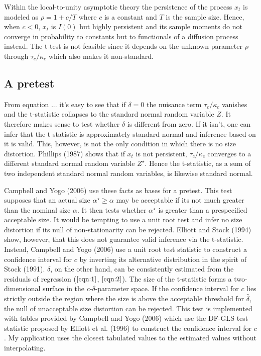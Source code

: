 \documentclass{article}
\begin{document}
Within the local-to-unity asymptotic theory the persistence of the process $x_{t}$ is modeled as $\rho=1+c / T$ where $c$ is a constant and $T$ is the sample size. Hence, when $c<0$, $x_{t}$ is $I(0)$ but highly persistent and its sample moments do not converge in probability to constants but to functionals of a diffusion process instead.  The t-test is not feasible since it depends on the unknown parameter $\rho$ through $\tau_{c} / \kappa_{c}$ which also makes it non-standard. 

\subsection{A pretest}
\label{pretest}
From equation ... it's easy to see that if $\delta = 0$ the nuisance term $\tau_{c} / \kappa_{c}$ vanishes and the t-statistic collapses to the standard normal  random variable $Z$. It therefore makes sense to test whether $\delta$ is different from zero. If it isn't, one can infer that the t-statistic is approximately standard normal and inference based on it is valid. This, however, is not the only condition in which there is no size distortion. Phillips (1987) shows that if $x_{t}$ is not persistent, $\tau_{c} / \kappa_{c}$ converges to a different standard normal random variable $Z^{\star}$. Hence the t-statistic, as a sum of two independent standard normal random variables, is likewise standard normal. 

Campbell and Yogo (2006) use these facts as bases for a pretest. This test supposes that an actual size $\alpha^{\star}  \geq \alpha$ may be acceptable if its not much greater than the nominal size $\alpha$. It then tests whether $\alpha^{\star}$ is greater than a prespecified acceptable size. It would be tempting to use a unit root test and infer no size distortion if its null of non-stationarity can be rejected. Elliott and Stock (1994) show, however, that this does not guarantee valid inference via the t-statistic. Instead, Campbell and Yogo (2006) use a unit root test statistic to construct a confidence interval for $c$ by inverting its alternative distribution in the spirit of Stock (1991). $\delta$, on the other hand, can be consistently estimated from the residuals of regression ($\ref{eqn:1}$, $\ref{eqn:2}$). The size of the t-statistic forms a two-dimensional surface in the $c$-$\delta$-parameter space. If the confidence interval for $c$ lies strictly outside the region where the size is above the acceptable threshold for $\hat{\delta}$, the null of unacceptable size distortion can be rejected. This test is implemented with tables provided by Campbell and Yogo (2006) which use the DF-GLS test statistic proposed by Elliott et al. (1996) to construct the confidence interval for $c$. My application uses the closest tabulated values to the estimated values without interpolating.
\end{document}
